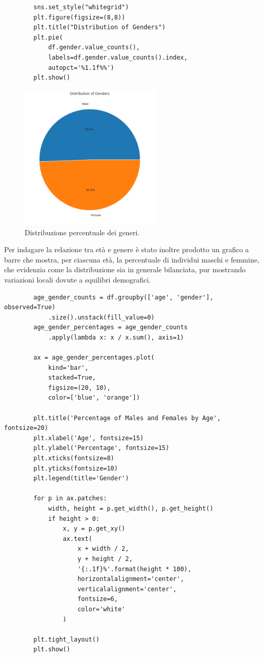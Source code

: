 \documentclass[a4paper,12pt]{report}
\begin{document}
	\begin{verbatim}
		sns.set_style("whitegrid")
		plt.figure(figsize=(8,8))
		plt.title("Distribution of Genders")
		plt.pie(
			df.gender.value_counts(), 
			labels=df.gender.value_counts().index, 
			autopct='%1.1f%%')
		plt.show()
	\end{verbatim}
	
	\begin{figure}[H]
		\centering
		\includegraphics[width=0.6\textwidth]{img/pie_gender_images.png}
		\caption{Distribuzione percentuale dei generi.}
	\end{figure}
	
	Per indagare la relazione tra età e genere è stato inoltre prodotto un grafico a barre che mostra, per ciascuna età, la percentuale di individui maschi e femmine, che evidenzia come la distribuzione sia in generale bilanciata, pur mostrando variazioni locali dovute a squilibri demografici.
	
	\begin{verbatim}
		age_gender_counts = df.groupby(['age', 'gender'], observed=True)
			.size().unstack(fill_value=0)
		age_gender_percentages = age_gender_counts
			.apply(lambda x: x / x.sum(), axis=1)
		
		ax = age_gender_percentages.plot(
			kind='bar', 
			stacked=True, 
			figsize=(20, 10), 
			color=['blue', 'orange'])
		
		plt.title('Percentage of Males and Females by Age', fontsize=20)
		plt.xlabel('Age', fontsize=15)
		plt.ylabel('Percentage', fontsize=15)
		plt.xticks(fontsize=8)
		plt.yticks(fontsize=10)
		plt.legend(title='Gender')
		
		for p in ax.patches:
			width, height = p.get_width(), p.get_height()
			if height > 0:
				x, y = p.get_xy()
				ax.text(
					x + width / 2,
					y + height / 2,
					'{:.1f}%'.format(height * 100),
					horizontalalignment='center',
					verticalalignment='center',
					fontsize=6,
					color='white'
				)
		
		plt.tight_layout()
		plt.show()
	\end{verbatim}
	
\end{document}
